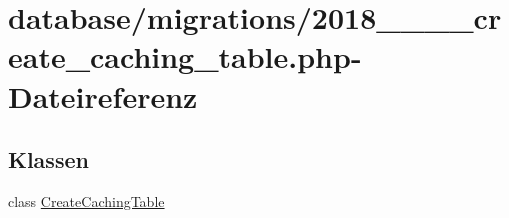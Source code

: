 \hypertarget{2018__06__12__162233__create__caching__table_8php}{}\section{database/migrations/2018\+\_\+\_\+\_\+\_\+create\+\_\+caching\+\_\+table.php-\/\+Dateireferenz}
\label{2018__06__12__162233__create__caching__table_8php}
\subsection*{Klassen}
\begin{DoxyCompactItemize}
\item 
class \hyperlink{classCreateCachingTable}{Create\+Caching\+Table}
\end{DoxyCompactItemize}
